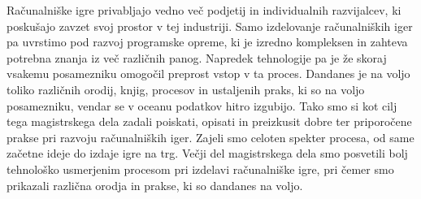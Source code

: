 \documentclass[12pt,a4paper,twoside]{book}
\begin{document}
Računalniške igre privabljajo vedno več podjetij in individualnih razvijalcev, ki poskušajo zavzet svoj prostor v tej industriji. Samo izdelovanje računalniških iger pa uvrstimo pod razvoj programske opreme, ki je izredno kompleksen in zahteva potrebna znanja iz več različnih panog. Napredek tehnologije pa je že skoraj vsakemu posamezniku omogočil preprost vstop v ta proces. Dandanes je na voljo toliko različnih orodij, knjig, procesov in ustaljenih praks, ki so na voljo posamezniku, vendar se v oceanu podatkov hitro izgubijo. Tako smo si kot cilj tega magistrskega dela zadali poiskati, opisati in preizkusit dobre ter priporočene prakse pri razvoju računalniških iger. Zajeli smo celoten spekter procesa, od same začetne ideje do izdaje igre na trg. Večji del magistrskega dela smo posvetili bolj tehnološko usmerjenim procesom pri izdelavi računalniške igre, pri čemer smo prikazali različna orodja in prakse, ki so dandanes na voljo.
\end{document}
